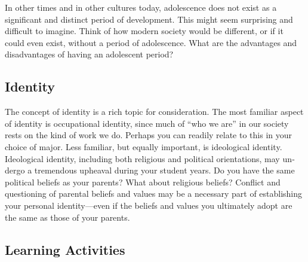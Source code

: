 \documentclass[
]{book}
\begin{document}
In other times and in other cultures to­day, adolescence does not exist as a significant and distinct period of develop­ment. This might seem surprising and difficult to imagine. Think of how modern society would be different, or if it could even exist, without a period of adolescence. What are the advantages and disadvantages of having an adolescent period?

\hypertarget{identity}{%
\subsection*{Identity}\label{identity}}

The concept of identity is a rich topic for consideration. The most familiar aspect of identity is occupational identity, since much of ``who we are'' in our society rests on the kind of work we do. Perhaps you can readily relate to this in your choice of major. Less familiar, but equally important, is ideological identity. Ideologi­cal identity, including both religious and political orientations, may un­dergo a tremen­dous upheaval during your student years. Do you have the same political beliefs as your parents? What about religious beliefs? Conflict and questioning of parental beliefs and values may be a necessary part of establishing your personal iden­tity---even if the beliefs and values you ultimately adopt are the same as those of your parents.

\hypertarget{learning-activities-2}{%
\subsection*{Learning Activities}\label{learning-activities-2}}
\end{document}

